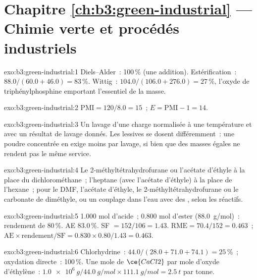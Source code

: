 \section*{Chapitre \ref{ch:b3:green-industrial} --- Chimie verte et procédés industriels}

\begin{solution}{exo:b3:green-industrial:1}
Diels--Alder~: 100\,\% (une addition). Estérification~: $88.0/(60.0 + 46.0) = 83$\,\%. Wittig~:
$104.0/(106.0 + 276.0) = 27$\,\%, l'oxyde de triphénylphosphine emportant l'essentiel de la masse.
\end{solution}

\begin{solution}{exo:b3:green-industrial:2}
$\mathrm{PMI} = 120/8.0 = 15$~; $E = \mathrm{PMI} - 1 = 14$.
\end{solution}

\begin{solution}{exo:b3:green-industrial:3}
Un lavage d'une charge normalisée à une température et avec un résultat de
lavage donnés. Les lessives se dosent différemment~: une poudre concentrée
en exige moins par lavage, si bien que des masses égales ne rendent pas le
même service.
\end{solution}

\begin{solution}{exo:b3:green-industrial:4}
Le 2-méthyltétrahydrofurane ou l'acétate d'éthyle à la place du
dichlorométhane~; l'heptane (avec l'acétate d'éthyle) à la place de
l'hexane~; pour le DMF, l'acétate d'éthyle, le 2-méthyltétrahydrofurane ou
le carbonate de diméthyle, ou un couplage dans l'eau avec des ,
selon les réactifs.
\end{solution}

\begin{solution}{exo:b3:green-industrial:5}
1.000 mol d'acide~; 0.800 mol d'ester (\qty{88.0}{g/mol})~: rendement de 80\,\%. AE 83.0\,\%. SF $= 152/106 = 1.43$.
$\mathrm{RME} = 70.4/152 = 0.463$~; $\mathrm{AE} \times \text{rendement}/\mathrm{SF} = 0.830 \times 0.80/1.43 = 0.463$.
\end{solution}

\begin{solution}{exo:b3:green-industrial:6}
Chlorhydrine~: $44.0/(28.0 + 71.0 + 74.1) = 25$\,\%~; oxydation directe~: 100\,\%. Une mole de $\ce{CaCl2}$ par mole
d'oxyde d'éthylène~: $\qty{1.0e6}{g}/\qty{44.0}{g/mol} \times \qty{111.1}{g/mol} = \qty{2.5}{t}$ par tonne.
\end{solution}

